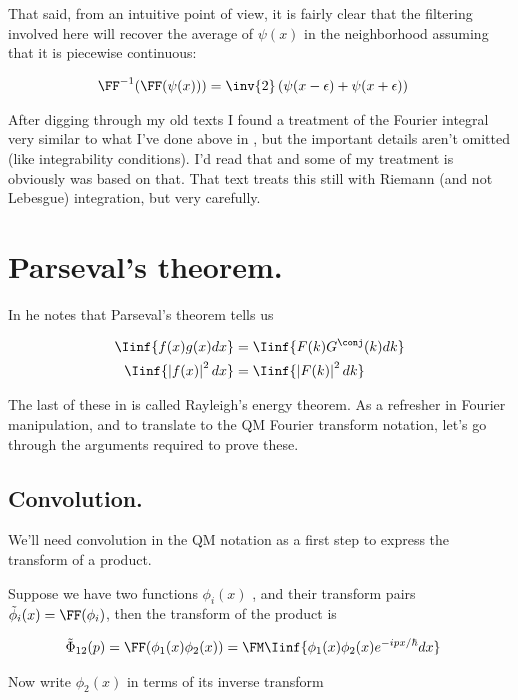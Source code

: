 That said, from an intuitive point of view, it is fairly clear that the filtering involved here will recover the average of
$\psi(x)$ in the neighborhood assuming that it is piecewise continuous:

\begin{align*}
\FF^{-1}(\FF(\psi(x))) &= \inv{2} \left( \psi(x -\epsilon) + \psi(x + \epsilon) \right)
\end{align*}

After digging through my old texts I found a treatment of the Fourier integral very similar to what I've done above
in \cite{lepage1980cva}, but the important details aren't omitted (like integrability conditions).
I'd read that and some of my treatment is obviously was based on that.  That text 
treats this still with Riemann (and not Lebesgue) integration, but very carefully.

\section{Parseval's theorem. }

In \cite{mcmahon2005qmd} he notes that Parseval's theorem tells us

\begin{align*}
\Iinf{f(x)g(x) dx} &= \Iinf{F(k)G^\conj(k) dk} \\
\Iinf{\Abs{f(x)}^2 dx} &= \Iinf{\Abs{F(k)}^2 dk}
\end{align*}

The last of these in \cite{haykin1994cs} is called Rayleigh's energy theorem.  
As a refresher in 
Fourier manipulation, and to translate to the QM Fourier transform notation, let's go through the arguments
required to prove these.

\subsection{Convolution. }

We'll need convolution in the QM notation as a first step to express
the transform of a product.

Suppose we have two functions 
$\phi_i(x)$
, and their transform
pairs 
$\tilde{\phi}_i(x) = \FF(\phi_i)$, then the transform of the product is

\begin{align*}
\tilde{\Phi}_{12}(p) = \FF(\phi_1(x)\phi_2(x)) &= \FM \Iinf{\phi_1(x) \phi_2(x) e^{-ipx/\hbar} dx}
\end{align*}

Now write $\phi_2(x)$ in terms of its inverse transform

